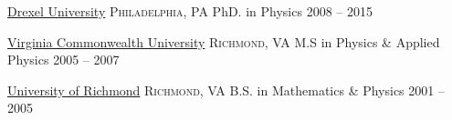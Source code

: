 \documentclass[10pt,a4paper]{article}
\begin{document}






\spacedhrule{2.0em}{0.2em}



\headedsection
  {\href{http://drexel.edu/}{Drexel University}}
  {\textsc{Philadelphia, PA}} {%
  \headedsubsection
    {PhD. in Physics}
    {2008 -- 2015}
    {}
}

\headedsection
  {\href{http://www.vcu.edu/}{Virginia Commonwealth University}}
  {\textsc{Richmond, VA}} {%
  \headedsubsection
    {M.S in Physics \& Applied Physics}
    {2005 -- 2007}
    {}
}

\headedsection
  {\href{http://www.richmond.edu/}{University of Richmond}}
  {\textsc{Richmond, VA}} {%
  \headedsubsection
    {B.S. in Mathematics \& Physics}
    {2001 -- 2005}
    {}
}






\end{document}
